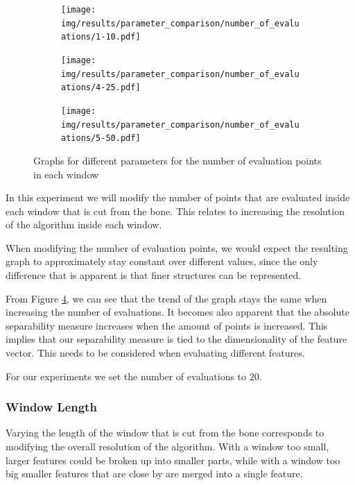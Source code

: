 \documentclass[pdftex,12pt,a4paper]{report}
\begin{document}
\begin{figure}[h]
	\centering
	\begin{subfigure}[b]{0.32\textwidth}
		\centering
		\texttt{[image: img/results/parameter\_comparison/number\_of\_evaluations/1-10.pdf]}
		\label{fig:number-evaluations-0}
	\end{subfigure}
	\begin{subfigure}[b]{0.32\textwidth}
		\centering
		\texttt{[image: img/results/parameter\_comparison/number\_of\_evaluations/4-25.pdf]}
		\label{fig:number-evaluations-1}
	\end{subfigure}
	\begin{subfigure}[b]{0.32\textwidth}
		\centering
		\texttt{[image: img/results/parameter\_comparison/number\_of\_evaluations/5-50.pdf]}
		\label{fig:number-evaluations-2}
	\end{subfigure}
	\caption{Graphs for different parameters for the number of evaluation points in each window}
	\label{fig:number-evaluations}
\end{figure}

In this experiment we will modify the number of points that are evaluated inside each window that is cut from the bone. This relates to increasing the resolution of the algorithm inside each window.

When modifying the number of evaluation points, we would expect the resulting graph to approximately stay constant over different values, since the only difference that is apparent is that finer structures can be represented.

From Figure \ref{fig:number-evaluations}, we can see that the trend of the graph stays the same when increasing the number of evaluations. It becomes also apparent that the absolute separability measure increases when the amount of points is increased. This implies that our separability measure is tied to the dimensionality of the feature vector. This needs to be considered when evaluating different features.

For our experiments we set the number of evaluations to $20$.

\subsubsection{Window Length}

Varying the length of the window that is cut from the bone corresponds to modifying the overall resolution of the algorithm. With a window too small, larger features could be broken up into smaller parts, while with a window too big smaller features that are close by are merged into a single feature.
\end{document}
